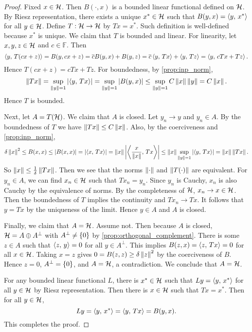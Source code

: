 \begin{proof}
    Fixed $x\in\mathcal{H}$. Then $B(\cdot, x)$ is a bounded linear functional 
    defined on $\mathcal{H}$. By Riesz representation, there exists a unique 
    $x^*\in\mathcal{H}$ such that $B(y,x) = \left\langle {y},\, {x^*} \right\rangle$ for all $y\in\mathcal{H}$. 
    Define $T:\mathcal{H}\to\mathcal{H}$ by $Tx = x^*$. Such definition is well-defined 
    because $x^*$ is unique. We claim that $T$ is bounded and linear. 
    For linearity, let $x,y,z\in\mathcal{H}$ and $c\in\mathbb{F}$. Then 
    \begin{equation*}
        \left\langle {y},\, {T(cx + z)} \right\rangle = B(y, cx + z) = \overline{c}B(y,x) + B(y,z) 
        = \overline{c}\left\langle {y},\, {Tx} \right\rangle + \left\langle {y},\, {Tz} \right\rangle = \left\langle {y},\, {cTx + Tz} \right\rangle.
    \end{equation*}
    Hence $T(cx+z) = cTx+Tz$. For boundedness, by \cref{prop:inp_norm}, 
    \begin{equation*}
        \left\lVert {Tx} \right\rVert = \sup_{\left\lVert {y} \right\rVert=1}\left\lvert {\left\langle {y},\, {Tx} \right\rangle} \right\rvert 
        = \sup_{\left\lVert {y} \right\rVert=1}\left\lvert {B(y,x)} \right\rvert \leq \sup_{\left\lVert {y} \right\rVert=1} C\left\lVert {x} \right\rVert\left\lVert {y} \right\rVert 
        = C\left\lVert {x} \right\rVert.
    \end{equation*}
    Hence $T$ is bounded. 

    Next, let $A = T(\mathcal{H})$. We claim that $A$ is closed. Let $y_n\to y$ 
    and $y_n\in A$. By the boundedness of $T$ we have $\left\lVert {Tx} \right\rVert\leq C\left\lVert {x} \right\rVert$. 
    Also, by the coerciveness and \cref{prop:inp_norm},
    \begin{equation*}
        \delta\left\lVert {x} \right\rVert^2 \leq B(x,x) \leq \left\lvert {B(x,x)} \right\rvert 
        = \left\lvert {\left\langle {x},\, {Tx} \right\rangle} \right\rvert = \left\lVert {x} \right\rVert\left\lvert {\left\langle {\frac{x}{\left\lVert {x} \right\rVert}},\, {Tx} \right\rangle} \right\rvert 
        \leq \left\lVert {x} \right\rVert\sup_{\left\lVert {y} \right\rVert = 1} \left\lvert {\left\langle {y},\, {Tx} \right\rangle} \right\rvert = \left\lVert {x} \right\rVert\left\lVert {Tx} \right\rVert.
    \end{equation*}
    So $\left\lVert {x} \right\rVert\leq \frac{1}{\delta}\left\lVert {Tx} \right\rVert$. Then we see that 
    the norms $\left\lVert {\cdot} \right\rVert$ and $\left\lVert {T(\cdot)} \right\rVert$ are equivalent. 
    For $y_n\in A$, we can find $x_n\in\mathcal{H}$ such that $Tx_n = y_n$. 
    Since $y_n$ is Cauchy, $x_n$ is also Cauchy by the equivalence 
    of norms. By the completeness of $\mathcal{H}$, $x_n\to x\in\mathcal{H}$. 
    Then the boundedness of $T$ implies the continuity and 
    $Tx_n\to Tx$. It follows that $y = Tx$ by the uniqueness of 
    the limit. Hence $y\in A$ and $A$ is closed. 

    Finally, we claim that $A = \mathcal{H}$. Assume not. Then because 
    $A$ is closed, $\mathcal{H} = A\oplus A^{\perp}$ with $A^\perp\neq\left\{ {0} \right\}$ 
    by \cref{prop:orthogonal_complement}. There is some $z\in A$ 
    such that $\left\langle {z},\, {y} \right\rangle = 0$ for all $y\in A^\perp$. This implies 
    $B(z,x) = \left\langle {z},\, {Tx} \right\rangle = 0$ for all $x\in\mathcal{H}$. Taking $x = z$ 
    gives $0 = B(z,z) \geq \delta\left\lVert {z} \right\rVert^2$ by the coerciveness of $B$. 
    Hence $z = 0$, $A^\perp = \left\{ {0} \right\}$, and $A = \mathcal{H}$, a contradiction. 
    We conclude that $A = \mathcal{H}$. 

    For any bounded linear functional $L$, there is $x^*\in\mathcal{H}$ such that 
    $Ly = \left\langle {y},\, {x^*} \right\rangle$ for all $y\in\mathcal{H}$ by Riesz representation. 
    Then there is $x\in\mathcal{H}$ such that $Tx = x^*$. Then for all $y\in\mathcal{H}$, 
    \begin{equation*}
        Ly = \left\langle {y},\, {x^*} \right\rangle = \left\langle {y},\, {Tx} \right\rangle = B(y,x).
    \end{equation*}
    This completes the proof.
\end{proof}
